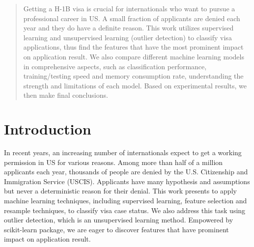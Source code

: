 
\date{Received: date / Accepted: date}


\maketitle

\begin{abstract}
Getting a H-1B visa is crucial for internationals who want to pursue a professional career in US. A small fraction of applicants are denied each year  and they do have a definite reason. This work utilizes supervised learning and unsupervised learning (outlier detection) to classify visa applications, thus find the features that have the most prominent impact on application result. We also compare different machine learning models in comprehensive aspects, such as classification performance, training/testing speed and memory consumption rate, understanding the strength and limitations of  each model. Based on experimental results, we then make final conclusions.
\end{abstract}

\section{Introduction}
\label{intro}

In recent years, an increasing number of internationals expect to get a working permission in US for various reasons. Among more than half of a million applicants each year, thousands of people are denied by the U.S. Citizenship and Immigration Service (USCIS). Applicants have many hypothesis and assumptions but never a deterministic reason for their denial. This work presents to apply machine learning techniques, including supervised learning, feature selection and resample techniques, to classify visa case status. We also address this task using outlier detection, which is an unsupervised learning method. Empowered by scikit-learn package, we are eager to discover features that have prominent impact on application result.

